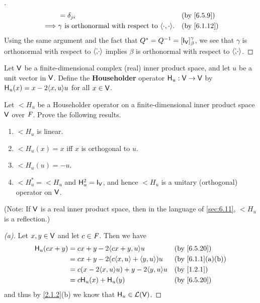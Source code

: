 \begin{proof}[]
\begin{align*}
             & = \delta_{j i}                                                                                                        &  & \by{6.5.9}  \\
    \implies & \gamma \text{ is orthonormal with respect to } \inn{\cdot, \cdot}.                                                    &  & \by{6.1.12}
  \end{align*}
  Using the same argument and the fact that \(Q^* = Q^{-1} = [\IT[\V]]_{\beta}^{\gamma}\), we see that \(\gamma\) is orthonormal with respect to \(\left\langle\dot, \cdot\right\rangle\) implies \(\beta\) is orthonormal with respect to \(\left\langle\dot, \cdot\right\rangle\).
\end{proof}

\begin{defn}\label{6.5.20}
  Let \(\mathsf{V}\) be a finite-dimensional complex (real) inner product space, and let \(u\) be a unit vector in \(\mathsf{V}\).
  Define the \textbf{Householder} operator \(\mathsf{H}_u : \mathsf{V} \to \mathsf{V}\) by \(\lt{H}_u(x) = x - 2 \inn{x, u} u\) for all \(x \in \mathsf{V}\).
\end{defn}

\begin{ex}\label{ex:6.5.31}
  Let \(\lt{H}_u\) be a Householder operator on a finite-dimensional inner product space \(\mathsf{V}\) over \(\mathit{F}\).
  Prove the following results.
  \begin{enumerate}
    \item \(\lt{H}_u\) is linear.
    \item \(\lt{H}_u(x) = x\) iff \(x\) is orthogonal to \(u\).
    \item \(\lt{H}_u(u) = -u\).
    \item \(\lt{H}_u^* = \lt{H}_u\) and \(\lt{H}_u^2 = \IT[\V]\), and hence \(\lt{H}_u\) is a unitary (orthogonal) operator on \(\mathsf{V}\).
  \end{enumerate}
  (Note:
  If \(\mathsf{V}\) is a real inner product space, then in the language of \cref{sec:6.11}, \(\lt{H}_u\) is a reflection.)
\end{ex}

\begin{proof}[(a)]
  Let \(x, y \in \mathsf{V}\) and let \(c \in \mathit{F}\).
  Then we have
  \begin{align*}
    \lt{H}_u(cx + y) & = cx + y - 2 \inn{cx + y, u} u                &  & \by{6.5.20}     \\
                     & = cx + y - 2 (c \inn{x, u} + \inn{y, u}) u    &  & \by{6.1.1}[a,b] \\
                     & = c (x - 2 \inn{x, u} u) + y - 2 \inn{y, u} u &  & \by{1.2.1}      \\
                     & = c \lt{H}_u(x) + \lt{H}_u(y)                 &  & \by{6.5.20}
  \end{align*}
  and thus by \cref{2.1.2}(b) we know that \(\mathsf{H}_u \in \mathcal{L}(\mathsf{V})\).
\end{proof}

